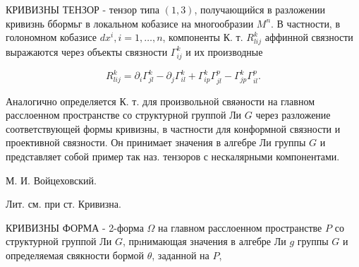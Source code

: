 \documentclass[10pt]{article}
\begin{document}
КРИВИЗНЫ ТЕНЗОР - тензор типа $(1,3)$, получающийся в разложении кривизнь ббормьг в локальном кобазисе на многообразии $M^{n}$. В частности, в голономном кобазисе $d x^{i}, i=1, \ldots, n$, компоненты К. т. $R_{l i j}^{k}$ аффинной связности выражаются через объекты связности $\Gamma_{i j}^{k}$ и их производные



\[

R_{l i j}^{k}=\partial_{i} \Gamma_{j l}^{k}-\partial_{j} \Gamma_{i l}^{k}+\Gamma_{i p}^{k} \Gamma_{j l}^{p}-\Gamma_{j p}^{k} \Gamma_{i l}^{p} .

\]



Аналогично определяется К. т. для произвольной свяәности на главном расслоенном пространстве со структурной группой Ли $G$ через разложение соответствующей формы кривизны, в частности для конформной связности и проективной связности. Он принимает значения в алгебре Ли группы $G$ и представляет собой пример так наз. тензоров с нескалярными компонентами.



М. И. Войцеховский.



Лит. см. при ст. Кривизна.



КРИВИЗНЫ ФОРМА - 2-форма $\Omega$ на главном расслоенном пространстве $P$ со структурной группой Ли $G$, прıнимающая значения в алгебре Ли $g$ группы $G$ и определяемая свякности бормой $\theta$, заданной на $P$,
\end{document}

